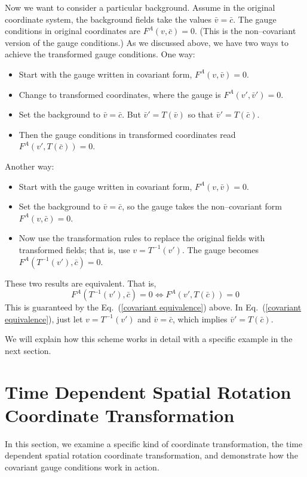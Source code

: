 Now we want to consider a particular background. Assume in the original coordinate system, the background fields take the values $\bar v = \bar c$. The gauge 
conditions in original coordinates are $F^A\left(v,\bar c\right) = 0$. (This is the non--covariant version of the gauge conditions.) As we discussed above, we have two ways to achieve the transformed gauge conditions. One way: 
\begin{itemize}
	\item Start with the gauge written in covariant form, $F^A\left(v,\bar v\right) = 0$.
	\item Change to transformed coordinates, where the gauge is $F^A\left(v',\bar v'\right) = 0$.
	\item Set the background to $\bar v = \bar c$. But $\bar v' = T\left(\bar v\right)$ so that $\bar v' = T\left(\bar c\right)$. 
	\item Then the gauge conditions in transformed coordinates read $F^A\left(v',T\left(\bar c\right)\right) = 0$. 
\end{itemize}
Another way: 
\begin{itemize}
	\item Start with the gauge written in covariant form, $F^A\left(v,\bar v\right) = 0$.
	\item Set the background to $\bar v = \bar c$, so the gauge takes the non--covariant form $F^A\left(v,\bar c\right) = 0$. 
	\item Now use the transformation rules to replace the original fields with transformed fields; that is, use $v = T^{-1}\left(v'\right)$. 
	The gauge becomes $F^A\left(T^{-1}\left(v'\right),\bar c\right) = 0$. 
\end{itemize}
These two results are equivalent. That is, 
\begin{equation}
	F^A\left(T^{-1}\left(v'\right),\bar c\right) = 0 \Longleftrightarrow F^A\left(v',T\left(\bar c\right)\right) = 0
\end{equation}
This is guaranteed by the Eq.~(\ref{covariant equivalence}) above. In Eq.~(\ref{covariant equivalence}), just let $v = T^{-1}\left(v'\right)$ and $\bar v = \bar c$, which implies $\bar v' = T\left(\bar c\right)$.

We will explain how this scheme works in detail with a specific example in the next section. 

\section{Time Dependent Spatial Rotation Coordinate Transformation}\label{example}
In this section, we examine a specific kind of coordinate transformation, the time dependent spatial rotation coordinate transformation, and demonstrate how the covariant gauge conditions work in action. 

